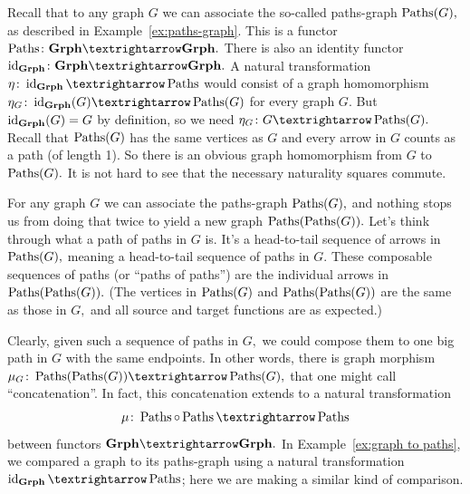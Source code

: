 \documentclass[../main/CT4S-EN-RU]{subfiles}
\begin{document}
\begin{exampleRUS}
\end{exampleRUS}

\begin{exampleENG}\label{ex:graph to paths}
Recall that to any graph $G$ we can associate the so-called paths-graph $\operatorname{Paths}(G),$ as described in Example~\ref{ex:paths-graph}. This is a functor $\Paths\colon\Grph{→}\Grph.$ There is also an identity functor $\id_{\Grph}\colon\Grph{→}\Grph.$ A natural transformation $\eta\colon\id_\Grph{→}\Paths$ would consist of a graph homomorphism $\eta_G\colon \id_\Grph(G){→}\Paths(G)$ for every graph $G.$ But $\operatorname{id}_{\mathbf{Grph}}(G)=G$ by definition, so we need $\eta_G\colon G{→}\Paths(G).$ Recall that $\operatorname{Paths}(G)$ has the same vertices as $G$ and every arrow in $G$ counts as a path (of length 1). So there is an obvious graph homomorphism from $G$ to $\operatorname{Paths}(G).$ It is not hard to see that the necessary naturality squares commute.
\end{exampleENG}

\begin{exampleRUS}\label{ex:graph to paths}
\end{exampleRUS}

\begin{exampleENG}\label{ex:concat paths of paths}
For any graph $G$ we can associate the paths-graph $\operatorname{Paths}(G),$ and nothing stops us from doing that twice to yield a new graph $\operatorname{Paths}(\operatorname{Paths}(G)).$ Let's think through what a path of paths in $G$ is. It's a head-to-tail sequence of arrows in $\operatorname{Paths}(G),$ meaning a head-to-tail sequence of paths in $G.$ These composable sequences of paths (or “paths of paths”) are the individual arrows in $\operatorname{Paths}(\operatorname{Paths}(G)).$ (The vertices in $\operatorname{Paths}(G)$ and $\operatorname{Paths}(\operatorname{Paths}(G))$ are the same as those in $G,$ and all source and target functions are as expected.)

Clearly, given such a sequence of paths in $G,$ we could compose them to one big path in $G$ with the same endpoints. In other words, there is graph morphism $\mu_G\colon\Paths(\Paths(G)){→}\Paths(G),$ that one might call “concatenation”. In fact, this concatenation extends to a natural transformation $$\mu\colon\Paths\circ\Paths{→}\Paths$$ between functors $\Grph{→}\Grph.$ In Example~\ref{ex:graph to paths}, we compared a graph to its paths-graph using a natural transformation $\id_{\Grph}{→}\Paths$; here we are making a similar kind of comparison.
\end{exampleENG}
\end{document}
